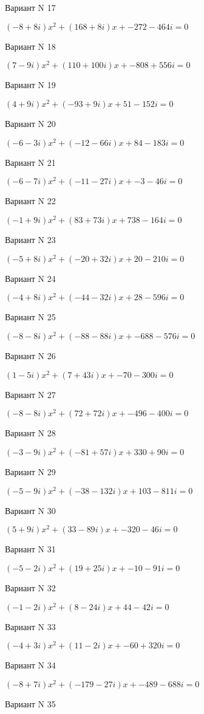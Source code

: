 \documentclass[11pt]{report}
\begin{document}
Вариант N 17

$(-8 + 8 i)x^2 + (168 + 8 i)x + -272 - 464 i = 0$

Вариант N 18

$(7 - 9 i)x^2 + (110 + 100 i)x + -808 + 556 i = 0$

Вариант N 19

$(4 + 9 i)x^2 + (-93 + 9 i)x + 51 - 152 i = 0$

Вариант N 20

$(-6 - 3 i)x^2 + (-12 - 66 i)x + 84 - 183 i = 0$

Вариант N 21

$(-6 - 7 i)x^2 + (-11 - 27 i)x + -3 - 46 i = 0$

Вариант N 22

$(-1 + 9 i)x^2 + (83 + 73 i)x + 738 - 164 i = 0$

Вариант N 23

$(-5 + 8 i)x^2 + (-20 + 32 i)x + 20 - 210 i = 0$

Вариант N 24

$(-4 + 8 i)x^2 + (-44 - 32 i)x + 28 - 596 i = 0$

Вариант N 25

$(-8 - 8 i)x^2 + (-88 - 88 i)x + -688 - 576 i = 0$

Вариант N 26

$(1 - 5 i)x^2 + (7 + 43 i)x + -70 - 300 i = 0$

Вариант N 27

$(-8 - 8 i)x^2 + (72 + 72 i)x + -496 - 400 i = 0$

Вариант N 28

$(-3 - 9 i)x^2 + (-81 + 57 i)x + 330 + 90 i = 0$

Вариант N 29

$(-5 - 9 i)x^2 + (-38 - 132 i)x + 103 - 811 i = 0$

Вариант N 30

$(5 + 9 i)x^2 + (33 - 89 i)x + -320 - 46 i = 0$

Вариант N 31

$(-5 - 2 i)x^2 + (19 + 25 i)x + -10 - 91 i = 0$

Вариант N 32

$(-1 - 2 i)x^2 + (8 - 24 i)x + 44 - 42 i = 0$

Вариант N 33

$(-4 + 3 i)x^2 + (11 - 2 i)x + -60 + 320 i = 0$

Вариант N 34

$(-8 + 7 i)x^2 + (-179 - 27 i)x + -489 - 688 i = 0$

Вариант N 35
\end{document}
